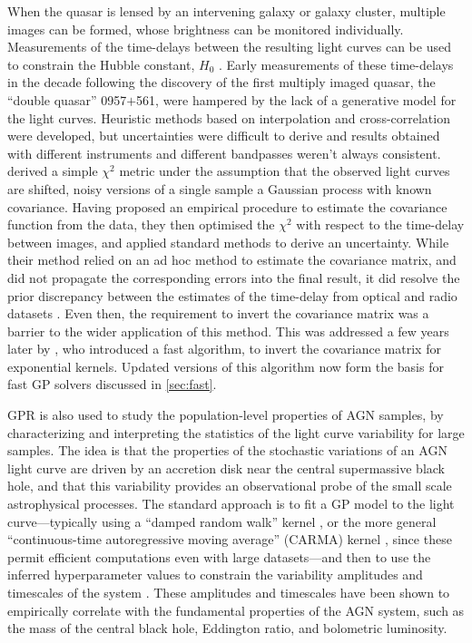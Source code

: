 \documentclass[letterpaper]{ar-1col}
\begin{document}
When the quasar is lensed by an intervening galaxy or galaxy cluster, multiple images can be formed, whose brightness can be monitored individually.
Measurements of the time-delays between the resulting light curves can be used to constrain the Hubble constant, $H_0$ \citep{doi:10.1146/annurev.aa.30.090192.001523}.
Early measurements of these time-delays in the decade following the discovery of the first multiply imaged quasar, the ``double quasar'' 0957$+$561, were hampered by the lack of a generative model for the light curves.
Heuristic methods based on interpolation and cross-correlation were developed, but uncertainties were difficult to derive and results obtained with different instruments and different bandpasses weren't always consistent.
\citet{prh92a} derived a simple $\chi^2$ metric under the assumption that the observed light curves are shifted, noisy versions of a single sample a Gaussian process with known covariance.
Having proposed an empirical procedure to estimate the covariance function from the data, they then optimised the $\chi^2$ with respect to the time-delay between images, and applied standard methods to derive an uncertainty.
While their method relied on an ad hoc method to estimate the covariance matrix, and did not propagate the corresponding errors into the final result, it did resolve the prior discrepancy between the estimates of the time-delay from optical and radio datasets \citep{prh92b}.
Even then, the requirement to invert the covariance matrix was a barrier to the wider application of this method.
This was addressed a few years later by \citet{pr95}, who introduced a fast algorithm, to invert the covariance matrix for exponential kernels.
Updated versions of this algorithm now form the basis for fast GP solvers discussed in \autoref{sec:fast}.

GPR is also used to study the population-level properties of AGN samples, by characterizing and interpreting the statistics of the light curve variability for large samples.
The idea is that the properties of the stochastic variations of an AGN light curve are driven by an accretion disk near the central supermassive black hole, and that this variability provides an observational probe of the small scale astrophysical processes.
The standard approach is to fit a GP model to the light curve---typically using a ``damped random walk'' kernel \citep[e.g.,][]{2010ApJ...708..927K, 2010ApJ...721.1014M, 2012ApJ...753..106M}, or the more general ``continuous-time autoregressive moving average'' (CARMA) kernel \citep[e.g.,][]{2014ApJ...788...33K, 2022ApJ...930..157Z, 2022ApJ...936..132Y}, since these permit efficient computations even with large datasets---and then to use the inferred hyperparameter values to constrain the variability amplitudes and timescales of the system \citep[e.g.,][]{2010ApJ...708..927K, 2010ApJ...721.1014M, 2012ApJ...753..106M, 2014ApJ...788...33K, 2017MNRAS.470.3027K, 2019PASP..131f3001M, 2022MNRAS.514..164S, 2022ApJ...930..157Z, 2022ApJ...936..132Y}.
These amplitudes and timescales have been shown to empirically correlate with the fundamental properties of the AGN system, such as the mass of the central black hole, Eddington ratio, and bolometric luminosity.
\end{document}
